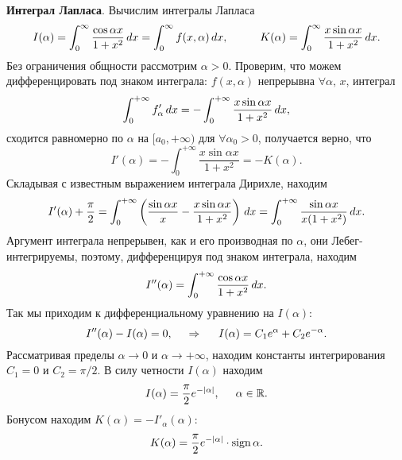 \textbf{Интеграл Лапласа}. Вычислим интегралы Лапласа
\begin{equation*}
    I(\alpha) = \int_0^\infty \frac{\cos \alpha x}{1 + x^2} \d x = \int_0^\infty f(x, \alpha) \d x, 
    \hspace{10 mm}
    K(\alpha) = \int_0^\infty \frac{x \sin \alpha x}{1 + x^2} \d x.
\end{equation*}
Без ограничения общности рассмотрим $\alpha > 0$. Проверим, что можем дифференцировать под знаком интеграла: $f(x, \alpha)$ непрерывна $\forall \alpha, \, x$, интеграл
\begin{equation*}
    \int_0^{+\infty} f'_\alpha \, d x = - \int_0^{+\infty} \frac{x \sin \alpha x}{1 + x^2} \, d x,
\end{equation*}
сходится равномерно по  $\alpha$ на $[a_0, +\infty)$ для $\forall \alpha_0 > 0$, получается верно, что
\begin{equation*}
    I'(\alpha) = - \int_0^{+\infty}  \frac{x \sin \alpha x}{1 + x^2} = 
    - K(\alpha).
\end{equation*}
Складывая с известным выражением интеграла Дирихле, находим
\begin{equation*}
    I'(\alpha) + \frac{\pi}{2} = \int_0^{+\infty}  \left(
        \frac{\sin \alpha x}{x} - \frac{x \sin \alpha x}{1+ x^2} 
    \right) \, d x = 
    \int_0^{+\infty} \frac{\sin \alpha x}{x (1 + x^2)} \, d x.
\end{equation*}
Аргумент интеграла непрерывен, как и его производная по $\alpha$, они Лебег-интегрируемы, поэтому, дифференцируя под знаком интеграла, находим
\begin{equation*}
    I''(\alpha) = \int_0^{+\infty}  \frac{\cos \alpha x}{1 + x^2} \, d x.
\end{equation*}
Так мы приходим к дифференциальному уравнению на $I(\alpha)$:
\begin{equation*}
    I''(\alpha) - I(\alpha) = 0,
    \hspace{0.5cm} \Rightarrow \hspace{0.5cm}
    I(\alpha) = C_1 e^\alpha + C_2 e^{-\alpha}.
\end{equation*}
Рассматривая пределы $\alpha \to 0$ и $\alpha \to + \infty$, находим константы интегрирования $C_1 = 0$ и $C_2 = \pi/2$. В силу четности $I(\alpha)$ находим
\begin{equation*}
    I(\alpha) = \frac{\pi}{2} e^{-|\alpha|}, \hspace{5 mm} \alpha \in \mathbb{R}.
\end{equation*}
Бонусом находим $K(\alpha) = - I'_\alpha (\alpha)$:
\begin{equation*}
    K(\alpha) = \frac{\pi}{2} e^{-|\alpha|} \cdot \mathop{\mathrm{sign}}\nolimits \alpha.
\end{equation*}

